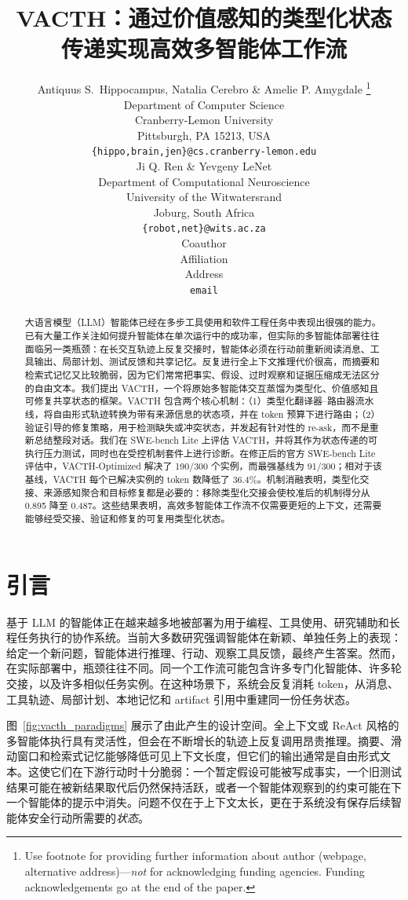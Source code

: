\documentclass{article} %
\title{VACTH：通过价值感知的类型化状态传递实现高效多智能体工作流}
\author{Antiquus S.~Hippocampus, Natalia Cerebro \& Amelie P. Amygdale \thanks{ Use footnote for providing further information
about author (webpage, alternative address)---\emph{not} for acknowledging
funding agencies.  Funding acknowledgements go at the end of the paper.} \\
Department of Computer Science\\
Cranberry-Lemon University\\
Pittsburgh, PA 15213, USA \\
\texttt{\{hippo,brain,jen\}@cs.cranberry-lemon.edu} \\
\And
Ji Q. Ren \& Yevgeny LeNet \\
Department of Computational Neuroscience \\
University of the Witwatersrand \\
Joburg, South Africa \\
\texttt{\{robot,net\}@wits.ac.za} \\
\AND
Coauthor \\
Affiliation \\
Address \\
\texttt{email}
}
\begin{document}
\maketitle

\begin{abstract}
大语言模型（LLM）智能体已经在多步工具使用和软件工程任务中表现出很强的能力。已有大量工作关注如何提升智能体在单次运行中的成功率，但实际的多智能体部署往往面临另一类瓶颈：在长交互轨迹上反复交接时，智能体必须在行动前重新阅读消息、工具输出、局部计划、测试反馈和共享记忆。反复进行全上下文推理代价很高，而摘要和检索式记忆又比较脆弱，因为它们常常把事实、假设、过时观察和证据压缩成无法区分的自由文本。我们提出 VACTH，一个将原始多智能体交互蒸馏为类型化、价值感知且可修复共享状态的框架。VACTH 包含两个核心机制：（1）类型化翻译器--路由器流水线，将自由形式轨迹转换为带有来源信息的状态项，并在 token 预算下进行路由；（2）验证引导的修复策略，用于检测缺失或冲突状态，并发起有针对性的 re-ask，而不是重新总结整段对话。我们在 SWE-bench Lite 上评估 VACTH，并将其作为状态传递的可执行压力测试，同时也在受控机制套件上进行诊断。在修正后的官方 SWE-bench Lite 评估中，VACTH-Optimized 解决了 190/300 个实例，而最强基线为 91/300；相对于该基线，VACTH 每个已解决实例的 token 数降低了 36.4\%。机制消融表明，类型化交接、来源感知聚合和目标修复都是必要的：移除类型化交接会使校准后的机制得分从 0.895 降至 0.487。这些结果表明，高效多智能体工作流不仅需要更短的上下文，还需要能够经受交接、验证和修复的可复用类型化状态。
\end{abstract}

\section{引言}
基于 LLM 的智能体正在越来越多地被部署为用于编程、工具使用、研究辅助和长程任务执行的协作系统。当前大多数研究强调智能体在新颖、单独任务上的表现：给定一个新问题，智能体进行推理、行动、观察工具反馈，最终产生答案。然而，在实际部署中，瓶颈往往不同。同一个工作流可能包含许多专门化智能体、许多轮交接，以及许多相似任务实例。在这种场景下，系统会反复消耗 token，从消息、工具轨迹、局部计划、本地记忆和 artifact 引用中重建同一份任务状态。

图~\ref{fig:vacth_paradigms} 展示了由此产生的设计空间。全上下文或 ReAct 风格的多智能体执行具有灵活性，但会在不断增长的轨迹上反复调用昂贵推理。摘要、滑动窗口和检索式记忆能够降低可见上下文长度，但它们的输出通常是自由形式文本。这使它们在下游行动时十分脆弱：一个暂定假设可能被写成事实，一个旧测试结果可能在被新结果取代后仍然保持活跃，或者一个智能体观察到的约束可能在下一个智能体的提示中消失。问题不仅在于上下文太长，更在于系统没有保存后续智能体安全行动所需要的\emph{状态}。
\end{document}
